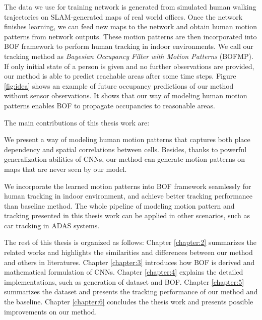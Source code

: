 The data we use for training network is generated from simulated human walking trajectories on SLAM-generated maps of real world offices. Once the network finishes learning, we can feed new maps to the network and obtain human motion patterns from network outputs. These motion patterns are then incorporated into BOF framework to perform human tracking in indoor environments. We call our tracking method as \textit{Bayesian Occupancy Filter with Motion Patterns} (BOFMP). If only initial state of a person is given and no further observations are provided, our method is able to predict reachable areas after some time steps. Figure \ref{fig:idea} shows an example of future occupancy predictions of our method without sensor observations. It shows that our way of modeling human motion patterns enables BOF to propagate occupancies to reasonable areas.

The main contributions of this thesis work are:

\begin{my_enumerate}
\item We present a way of modeling human motion patterns that captures both place dependency and spatial correlations between cells. Besides, thanks to powerful generalization abilities of CNNs, our method can generate motion patterns on maps that are never seen by our model.
\item We incorporate the learned motion patterns into BOF framework seamlessly for human tracking in indoor environment, and achieve better tracking performance than baseline method.  The whole pipeline of modeling motion pattern and tracking presented in this thesis work can be applied in other scenarios, such as car tracking in ADAS systems.
\end{my_enumerate}


The rest of this thesis is organized as follows: Chapter \ref{chapter:2} summarizes the related works and highlights the similarities and differences between our method and others in literatures. Chapter \ref{chapter:3} introduces how BOF is derived and mathematical formulation of CNNs. Chapter \ref{chapter:4} explains the detailed implementations, such as generation of dataset and BOF. Chapter \ref{chapter:5} summarizes the dataset and presents the tracking performance of our method and the baseline. Chapter \ref{chapter:6} concludes the thesis work and presents possible improvements on our method. 
